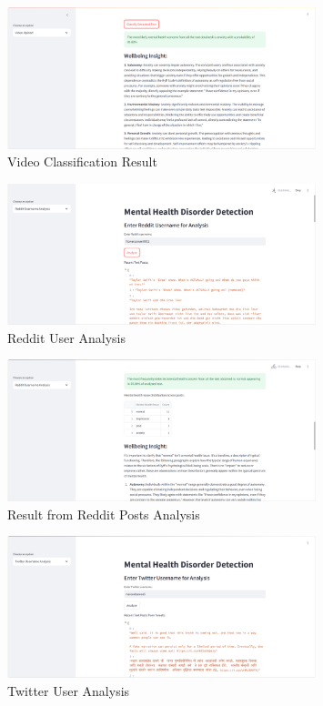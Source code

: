 \begin{figure}[h!]  
    \centering
    \includegraphics[width=0.8\textwidth]{App Images/13 Interface.png}  
    \caption{Video Classification Result}
    \label{06i}  %
\end{figure}

\pagebreak

\begin{figure}[h!]  
    \centering
    \includegraphics[width=0.8\textwidth]{App Images/06 Interface.png}  
    \caption{Reddit User Analysis}
    \label{07i}  %
\end{figure}

\begin{figure}[h!]  
    \centering
    \includegraphics[width=0.8\textwidth]{App Images/07 Interface.png}  
    \caption{Result from Reddit Posts Analysis}
    \label{08i}  %
\end{figure}


\begin{figure}[h!]  
    \centering
    \includegraphics[width=0.8\textwidth]{App Images/08 Interface.png}  
    \caption{Twitter User Analysis}
    \label{09i}  %
\end{figure}


